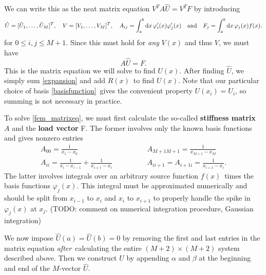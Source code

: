 We can write this as the neat matrix equation $V^T A \hat{U} = V^T F$ by introducing
\begin{equation*}
	\hat{U} = [\hat{U}_1, \dots, \hat{U}_M]^T,
	\quad
	V = [V_1, \dots, V_M]^T,
	\quad
	A_{ij} = \integral{\varphi'_i(x) \varphi'_j(x)}{x}{a}{b}
	\quad \text{and} \quad
	F_j = \integral{\varphi_j(x) f(x)}{x}{a}{b}.
\end{equation*}
for $0 \leq i, j \leq M+1$.
Since this must hold for \emph{any} $V(x)$ and thus $V$, we must have
\begin{equation}
	A \hat{U} = F.
	\label{fem_matrixeq}
\end{equation}
This is the matrix equation we will solve to find $U(x)$.
After finding $\hat{U}$, we simply sum \ref{expansion} and add $R(x)$ to find $U(x)$.
Note that our particular choice of basis \ref{basisfunction} gives the convenient property $U(x_i) = U_i$, so summing is not necessary in practice.

To solve \ref{fem_matrixeq}, we must first calculate the so-called \textbf{stiffness matrix} $A$ and the \textbf{load vector} F.
The former involves only the known basis functions and gives nonzero entries
\begin{align*}
	A_{00} = \frac{1}{x_1 - x_0}                           \qquad & \qquad A_{M+1 M+1} = \frac{1}{x_{M+1}-x_M} \\
	A_{ii} = \frac{1}{x_i-x_{i-1}} + \frac{1}{x_{i+1}-x_i} \qquad & \qquad A_{i i+1} = A_{i+1 i} = \frac{1}{x_{i+1}-x_i}.
\end{align*}
The latter involves integrals over an arbitrary source function $f(x)$ times the basis functions $\varphi_j(x)$.
This integral must be approximated numerically and should be split from $x_{i-1}$ to $x_i$ and $x_i$ to $x_{i+1}$ to properly handle the spike in $\varphi_j(x)$ at $x_j$.
(TODO: comment on numerical integration procedure, Gaussian integration)

We now impose $\hat{U}(a) = \hat{U}(b) = 0$ by removing the first and last entries in the matrix equation \emph{after} calculating the entire $(M+2) \times (M+2)$ system described above.
Then we construct $U$ by appending $\alpha$ and $\beta$ at the beginning and end of the $M$-vector $\hat{U}$.

